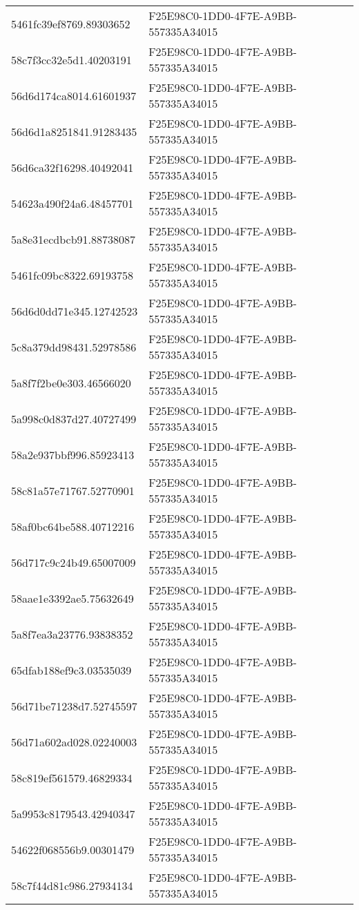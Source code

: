 \begin{tabular}{ll}
5461fc39ef8769.89303652 & F25E98C0-1DD0-4F7E-A9BB-557335A34015 \\
58c7f3cc32e5d1.40203191 & F25E98C0-1DD0-4F7E-A9BB-557335A34015 \\
56d6d174ca8014.61601937 & F25E98C0-1DD0-4F7E-A9BB-557335A34015 \\
56d6d1a8251841.91283435 & F25E98C0-1DD0-4F7E-A9BB-557335A34015 \\
56d6ca32f16298.40492041 & F25E98C0-1DD0-4F7E-A9BB-557335A34015 \\
54623a490f24a6.48457701 & F25E98C0-1DD0-4F7E-A9BB-557335A34015 \\
5a8e31ecdbcb91.88738087 & F25E98C0-1DD0-4F7E-A9BB-557335A34015 \\
5461fc09bc8322.69193758 & F25E98C0-1DD0-4F7E-A9BB-557335A34015 \\
56d6d0dd71e345.12742523 & F25E98C0-1DD0-4F7E-A9BB-557335A34015 \\
5c8a379dd98431.52978586 & F25E98C0-1DD0-4F7E-A9BB-557335A34015 \\
5a8f7f2be0e303.46566020 & F25E98C0-1DD0-4F7E-A9BB-557335A34015 \\
5a998c0d837d27.40727499 & F25E98C0-1DD0-4F7E-A9BB-557335A34015 \\
58a2e937bbf996.85923413 & F25E98C0-1DD0-4F7E-A9BB-557335A34015 \\
58c81a57e71767.52770901 & F25E98C0-1DD0-4F7E-A9BB-557335A34015 \\
58af0bc64be588.40712216 & F25E98C0-1DD0-4F7E-A9BB-557335A34015 \\
56d717c9c24b49.65007009 & F25E98C0-1DD0-4F7E-A9BB-557335A34015 \\
58aae1e3392ae5.75632649 & F25E98C0-1DD0-4F7E-A9BB-557335A34015 \\
5a8f7ea3a23776.93838352 & F25E98C0-1DD0-4F7E-A9BB-557335A34015 \\
65dfab188ef9c3.03535039 & F25E98C0-1DD0-4F7E-A9BB-557335A34015 \\
56d71be71238d7.52745597 & F25E98C0-1DD0-4F7E-A9BB-557335A34015 \\
56d71a602ad028.02240003 & F25E98C0-1DD0-4F7E-A9BB-557335A34015 \\
58c819ef561579.46829334 & F25E98C0-1DD0-4F7E-A9BB-557335A34015 \\
5a9953c8179543.42940347 & F25E98C0-1DD0-4F7E-A9BB-557335A34015 \\
54622f068556b9.00301479 & F25E98C0-1DD0-4F7E-A9BB-557335A34015 \\
58c7f44d81c986.27934134 & F25E98C0-1DD0-4F7E-A9BB-557335A34015 \\

\end{tabular}
